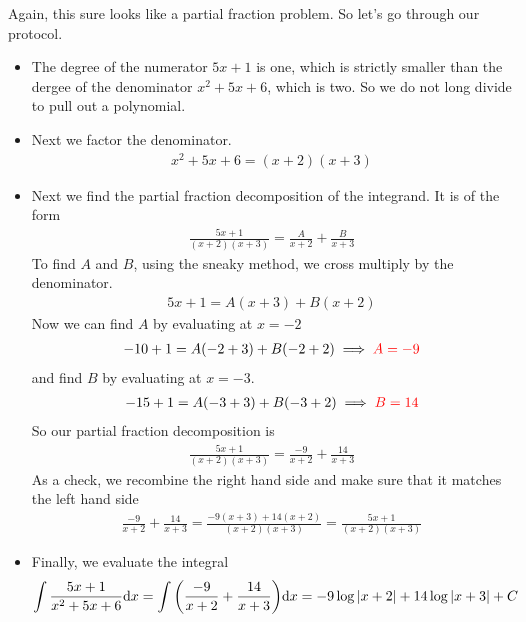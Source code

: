 \begin{solution}
Again, this sure looks like a partial fraction problem. So let's go
through our protocol.
\begin{itemize}
\item
The degree of the numerator $5x+1$ is one, which is strictly smaller
than the dergee of the denominator $x^2+5x+6$, which is two. So we do not
long divide to pull out a polynomial.

\item
Next we factor the denominator.
\begin{align*}
x^2+5x+6 = (x+2)(x+3)
\end{align*}

\item
Next we find the partial fraction decomposition of the integrand. It is
of the form
\begin{align*}
\frac{5x+1}{(x+2)(x+3)}
=\frac{A}{x+2} + \frac{B}{x+3}
\end{align*}
To find $A$ and $B$, using the sneaky method, we cross multiply by the
denominator.
\begin{align*}
5x+1= A(x+3) + B(x+2)
\end{align*}
Now we can find $A$ by evaluating at $x=-2$
\begin{align*}
-10+1 = A(-2+3) + B(-2+2)
\implies\color{red} A=-9
\end{align*}
and find $B$ by evaluating at $x=-3$.
\begin{align*}
-15+1 = A(-3+3) + B(-3+2)
\implies\color{red} B=14
\end{align*}
So our partial fraction decomposition is
\begin{align*}
\frac{5x+1}{(x+2)(x+3)}
=\frac{-9}{x+2} + \frac{14}{x+3}
\end{align*}
As a check, we recombine the right hand side and make sure that
it matches the left hand side
\begin{align*}
\frac{-9}{x+2} + \frac{14}{x+3}
=\frac{-9(x+3)+14(x+2)}{(x+2)(x+3)}
=\frac{5x+1}{(x+2)(x+3)}
\end{align*}

\item
Finally, we evaluate the integral
\begin{align*}
\int \frac{5x+1}{x^2+5x+6}\mathrm{d}x
=\int\bigg(\frac{-9}{x+2} + \frac{14}{x+3}\bigg)\mathrm{d}x
=-9\log|x+2|+14\log|x+3|+C
\end{align*}

\end{itemize}


\end{solution}


